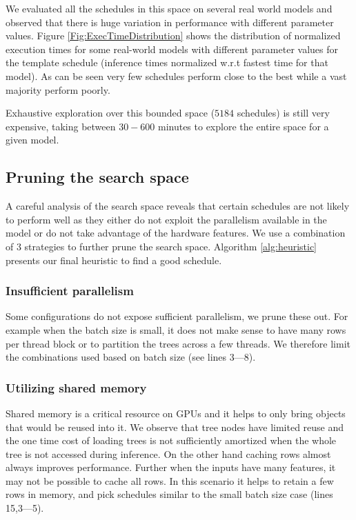 We evaluated all the schedules in this space on several real world models and observed that 
there is huge variation in performance with different parameter values. 
Figure \ref{Fig:ExecTimeDistribution} shows the distribution of normalized execution times
for some real-world models with different parameter values for the template schedule (inference
times normalized w.r.t fastest time for that model).
As can be seen very few schedules perform close to the best while a vast majority perform poorly.

Exhaustive exploration over this bounded space ($5184$ schedules) is still very expensive, taking
 between $30-600$ minutes to explore the entire space for a given model. 

\subsection{Pruning the search space}
 
A careful analysis of the search space reveals that certain schedules are not likely to 
perform well as they either do not exploit the parallelism available in the model or do not take advantage of the hardware features.
We use a combination of 3 strategies to further prune the search space.
Algorithm \ref{alg:heuristic} presents our final heuristic to find a good schedule.

\subsubsection*{Insufficient parallelism}
 Some configurations do not expose sufficient parallelism, we prune these out.
  For example when the batch size is small, it does not make sense to have many rows
  per thread block or to partition the trees across a few threads. 
  We therefore limit the combinations used based on batch size (see lines 3---8).
\subsubsection*{Utilizing shared memory}
  Shared memory is a critical resource on GPUs and it helps to only bring objects that would be reused into it. 
  We observe that tree nodes have limited reuse and the one time cost of loading trees is not sufficiently amortized when the whole tree is not accessed during inference. 
  On the other hand caching rows 
  almost always improves performance. Further when the inputs have many features, it may not be possible to cache all rows.
  In this scenario it helps to retain a few rows in memory, and pick schedules similar to the small batch size case (lines 15,3---5).

